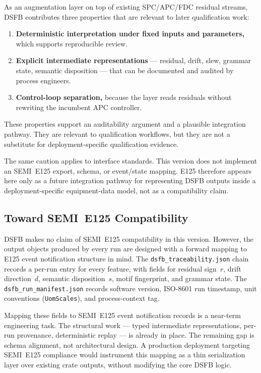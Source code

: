 \documentclass[11pt,letterpaper]{article}
\theoremstyle{scresult}
\begin{document}
As an augmentation layer on top of existing SPC/APC/FDC residual streams, DSFB
contributes three properties that are relevant to later qualification work:

\begin{enumerate}
  \item \textbf{Deterministic interpretation under fixed inputs and
        parameters,} which supports reproducible review.
  \item \textbf{Explicit intermediate representations} --- residual, drift,
        slew, grammar state, semantic disposition --- that can be documented
        and audited by process engineers.
  \item \textbf{Control-loop separation,} because the layer reads residuals
        without rewriting the incumbent APC controller.
\end{enumerate}

These properties support an auditability argument and a plausible integration
pathway. They are relevant to qualification workflows, but they are not a
substitute for deployment-specific qualification evidence.

The same caution applies to interface standards. This version does not
implement an SEMI~E125 export, schema, or event/state mapping. E125 therefore
appears here only as a future integration pathway for representing DSFB outputs
inside a deployment-specific equipment-data model, not as a compatibility claim.

\subsection{Toward SEMI~E125 Compatibility}

DSFB makes no claim of SEMI~E125 compatibility in this version. However, the
output objects produced by every run are designed with a forward mapping to
E125 event notification structure in mind. The \texttt{dsfb\_traceability.json}
chain records a per-run entry for every feature, with fields for residual
sign~$r$, drift direction~$d$, semantic disposition~$s$, motif fingerprint, and
grammar state. The \texttt{dsfb\_run\_manifest.json} records software version,
ISO-8601 run timestamp, unit conventions (\texttt{UomScales}), and
process-context tag.

Mapping these fields to SEMI~E125 event notification records is a near-term
engineering task. The structural work --- typed intermediate representations,
per-run provenance, deterministic replay --- is already in place. The remaining
gap is schema alignment, not architectural design. A production deployment
targeting SEMI~E125 compliance would instrument this mapping as a thin
serialization layer over existing crate outputs, without modifying the core
DSFB logic.
\end{document}
